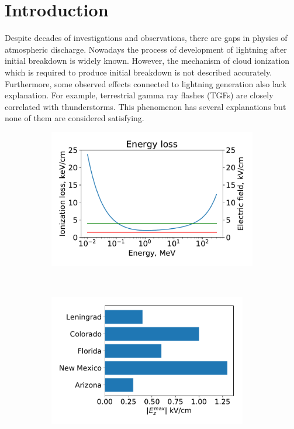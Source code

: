 \documentclass[utf8]{webofc}
\begin{document}
    \section{Introduction}
    Despite decades of investigations and observations, there are gaps in physics of atmospheric discharge. Nowadays the process of development of lightning after initial breakdown is widely known. However, the mechanism of cloud ionization which is required to produce initial breakdown is not described accurately. Furthermore, some observed effects connected to lightning generation also lack explanation. For example, terrestrial gamma ray flashes (TGFs) are closely correlated with thunderstorms. This phenomenon has several explanations but none of them are considered satisfying.
    \begin{figure}[ht!]
        \begin{subfigure}[b]{0.5\textwidth}
            \includegraphics[width=0.95\linewidth]{pictures/01_Gurevich}
            \caption{}
            \label{pic-gurevich-a}
        \end{subfigure}
        ~
        \begin{subfigure}[b]{0.5\textwidth}
            \includegraphics[width=0.95\textwidth]{pictures/03_extremal_field}

\end{subfigure}
\end{figure}
\end{document}
